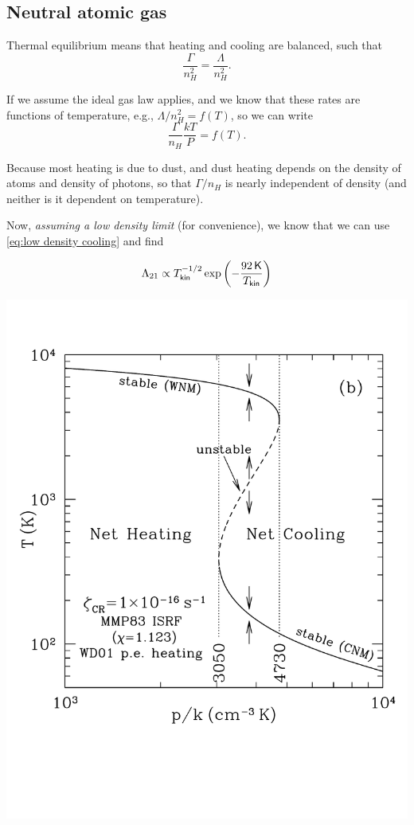 \documentclass{tufte-handout}
\renewcommand{\rm}{\sf}
\begin{document}
\subsection{Neutral atomic gas}

Thermal equilibrium means that heating and cooling are balanced, such that
\[ \frac{\Gamma}{n_H^2} = \frac{\Lambda}{n_H^2}. \]

If we assume the ideal gas law applies, and we know that these rates are functions of temperature, e.g., $\Lambda / n_H^2 = f(T)$, so we can write
\[ \frac{\Gamma}{n_H} \frac{kT}{P} = f(T). \]

Because most heating is due to dust, and dust heating depends on the density of atoms and density of photons, so that $\Gamma / n_H$ is nearly independent of density (and neither is it dependent on temperature).

Now, \textit{assuming a low density limit} (for convenience), we know that we can use \eqref{eq:low density cooling} and find

\[\Lambda_{21} \propto T_{\rm kin}^{-1/2} \exp\left (-\frac{92 {\rm \, K}}{T_{\rm kin}}\right )\]

\begin{marginfigure}
\includegraphics[]{ism_figures/Draine-30_2b}
\end{marginfigure}
\end{document}
